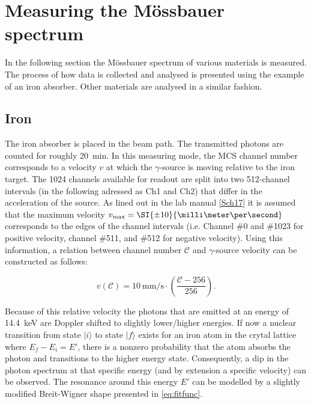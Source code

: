 
\section{Measuring the Mössbauer spectrum}
\label{sec:mössbauer-spectrum}

In the following section the Mössbauer spectrum of various materials is measured. The
process of how data is collected and analysed is presented using the example of an 
iron absorber. Other materials are analysed in a similar fashion.

\subsection{Iron}
\label{ssec:iron}

The iron absorber is placed in the beam path. The transmitted photons are counted for
roughly \SI{20}{\minute}. In this measuring mode, the MCS channel number corresponds
to a velocity $v$ at which the $\gamma$-source is moving relative to the iron target.
The 1024 channels available for readout are split into two 512-channel intervals (in the following adressed as Ch1 and Ch2) that differ in the acceleration of the source.
As lined out in the lab manual \autoref{Sch17} it is assumed that the maximum 
velocity $v_\text{max}=\SI{\pm10}{\milli\meter\per\second}$ corresponds to the edges 
of the channel intervals (i.e. Channel \#0 and \#1023 for positive velocity, channel 
\#511, and \#512 for negative velocity). Using this information, a relation between 
channel number $\mathcal{C}$ and $\gamma$-source velocity can be constructed as 
follows:

\begin{equation}
\label{eq:channel-to-velocity}
v(\mathcal{C}) = \SI{10}{\milli\meter\per\second}\cdot\left(\frac{\mathcal{C}-256}{256}\right).
\end{equation}

Because of this relative velocity the photons that are emitted at an energy of 
\SI{14.4}{\kilo\electronvolt} are Doppler shifted to slightly lower/higher energies.
If now a nuclear transition from state $|i\rangle$ to state $|f\rangle$ exists for an
iron atom in the crytal lattice where $E_f-E_i=E'$, there is a nonzero probability 
that the atom absorbs the photon and transitions to the higher energy state. 
Consequently, a dip in the photon spectrum at that specific energy (and by extension 
a specific velocity) can be observed. The resonance around this energy $E'$ can be 
modelled by a slightly modified Breit-Wigner shape presented in \autoref{eq:fitfunc}.

